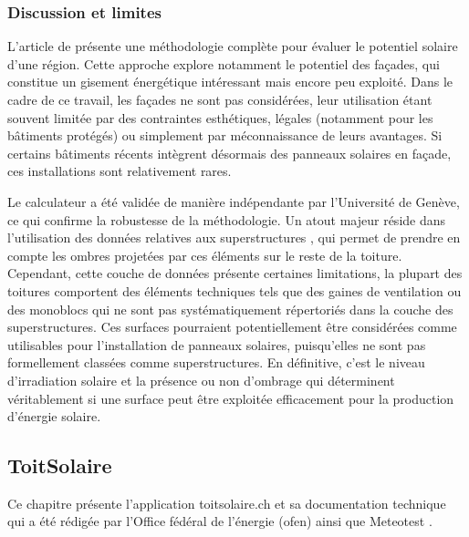 {\subsubsection{Discussion et limites}
\par{L'article de \citeauthor{desthieux_solar_2018} \cite{desthieux_solar_2018} présente une méthodologie complète pour évaluer le potentiel solaire d'une région. Cette approche explore notamment le potentiel des façades, qui constitue un gisement énergétique intéressant mais encore peu exploité. Dans le cadre de ce travail, les façades ne sont pas considérées, leur utilisation étant souvent limitée par des contraintes esthétiques, légales (notamment pour les bâtiments protégés) ou simplement par méconnaissance de leurs avantages. Si certains bâtiments récents intègrent désormais des panneaux solaires en façade, ces installations sont relativement rares.}
\par{Le calculateur a été validée de manière indépendante par l'Université de Genève, ce qui confirme la robustesse de la méthodologie. Un atout majeur réside dans l'utilisation des données relatives aux superstructures \cite{sitg_superstructures_nodate}, qui permet de prendre en compte les ombres projetées par ces éléments sur le reste de la toiture. Cependant, cette couche de données présente certaines limitations, la plupart des toitures comportent des éléments techniques tels que des gaines de ventilation ou des monoblocs qui ne sont pas systématiquement répertoriés dans la couche des superstructures. Ces surfaces pourraient potentiellement être considérées comme utilisables pour l'installation de panneaux solaires, puisqu'elles ne sont pas formellement classées comme superstructures. En définitive, c'est le niveau d'irradiation solaire et la présence ou non d'ombrage qui déterminent véritablement si une surface peut être exploitée efficacement pour la production d'énergie solaire.}

\subsection{ToitSolaire}

\par{Ce chapitre présente l'application toitsolaire.ch \cite{bfe_wie_nodate} et sa documentation technique \cite{klauser_energie_nodate} qui a été rédigée par l'Office fédéral de l'énergie (\acrshort{ofen}) ainsi que Meteotest \cite{meteotest_wir_2025}.}

}
